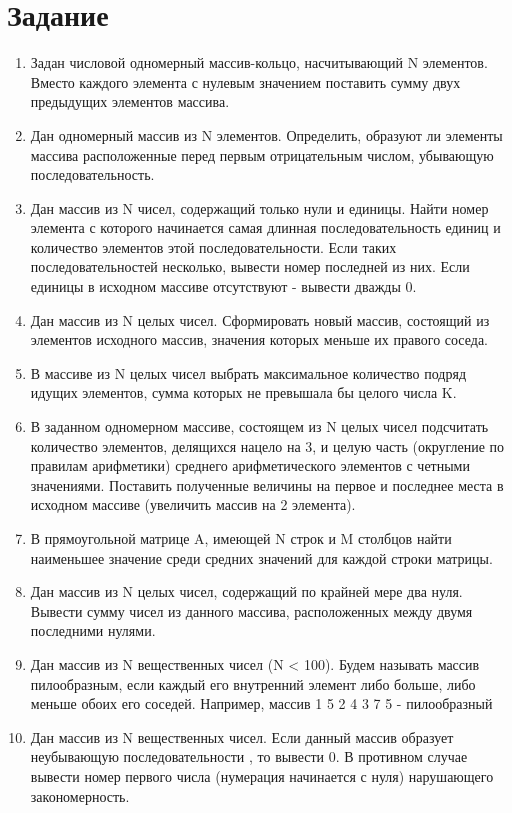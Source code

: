 \documentclass[a4paper,14pt]{extarticle}
\begin{document}
  \section*{Задание}
  \begin{enumerate}
    \item Задан числовой одномерный массив-кольцо, насчитывающий N элементов. Вместо каждого элемента с нулевым значением поставить сумму двух предыдущих элементов массива.
    
    \item Дан одномерный массив из N элементов. Определить, образуют ли элементы массива расположенные перед первым отрицательным числом, убывающую последовательность.
    
    \item Дан массив из N чисел, содержащий только нули и единицы. Найти номер элемента с которого начинается самая длинная последовательность единиц и количество элементов этой последовательности. Если таких последовательностей несколько, вывести номер последней из них. Если единицы в исходном массиве отсутствуют - вывести дважды 0.
    
    \item Дан массив из N целых чисел. Сформировать новый массив, состоящий из элементов исходного массив, значения которых меньше их правого соседа.
    
    \item В массиве из N целых чисел выбрать максимальное количество подряд идущих элементов, сумма которых не превышала бы целого числа K.
    
    \item В заданном одномерном массиве, состоящем из N целых чисел подсчитать количество элементов, делящихся нацело на 3, и целую часть (округление по правилам арифметики) среднего арифметического элементов с четными значениями. Поставить полученные величины на первое и последнее места в исходном массиве (увеличить массив на 2 элемента).
    
    \item В прямоугольной матрице A, имеющей N строк и M столбцов найти наименьшее значение среди средних значений для каждой строки матрицы.
    
    \item Дан массив из N целых чисел, содержащий по крайней мере два нуля. Вывести сумму чисел из данного массива, расположенных между двумя последними нулями.
    
    \item Дан массив из N вещественных чисел (N < 100). Будем называть массив пилообразным, если каждый его внутренний элемент либо больше, либо меньше обоих его соседей. Например, массив 1 5 2 4 3 7 5 - пилообразный
    
    \item Дан массив из N вещественных чисел. Если данный массив образует неубывающую последовательности , то вывести 0. В противном случае вывести номер первого числа (нумерация начинается с нуля) нарушающего закономерность.
  \end{enumerate}
\end{document}
